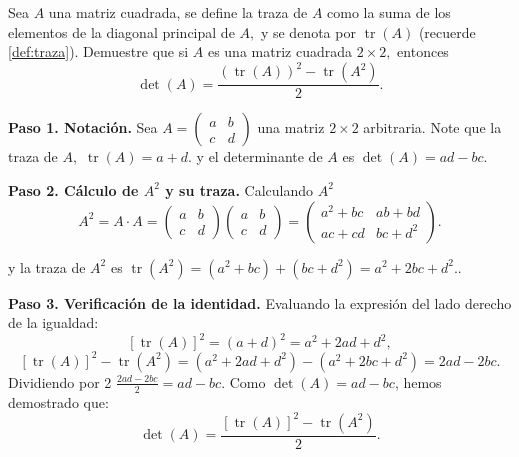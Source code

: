 \begin{prob} 
Sea $A$ una matriz cuadrada, se define la traza de $A$ como la suma de los elementos de la diagonal principal de $A,$ y se denota por $\operatorname{tr}(A)$ (recuerde \ref{def:traza}). Demuestre que si $A$ es una matriz cuadrada $2\times 2,$ entonces 
$$\det(A)=\dfrac{\left( \operatorname{tr}(A) \right)^{2}-\operatorname{tr}\left( A^{2} \right)}{2}.$$ 

\begin{myproof}
\textbf{Paso 1. Notación.} Sea \(A = \begin{pmatrix} a & b \\ c & d \end{pmatrix}\) una matriz \(2 \times 2\) arbitraria. Note que la traza de $A,$ \(
\operatorname{tr}(A) = a + d.
\) y el determinante de $A$ es \(
\det(A) = ad - bc.\)

\textbf{Paso 2. Cálculo de $A^2$ y su traza.} Calculando $A^2$
\[
A^2 = A \cdot A = \begin{pmatrix} a & b \\ c & d \end{pmatrix} \begin{pmatrix} a & b \\ c & d \end{pmatrix} = \begin{pmatrix} a^2 + bc & ab + bd \\ ac + cd & bc + d^2 \end{pmatrix}.
\]

 y la traza de $A^2$ es \(
\operatorname{tr}(A^2) = (a^2 + bc) + (bc + d^2) = a^2 + 2bc + d^2.
.\)

\textbf{Paso 3. Verificación de la identidad.} Evaluando la expresión del lado derecho de la igualdad:
\[
[\operatorname{tr}(A)]^2 = (a + d)^2 = a^2 + 2ad + d^2,
\]
\[
[\operatorname{tr}(A)]^2 - \operatorname{tr}(A^2) = (a^2 + 2ad + d^2) - (a^2 + 2bc + d^2) = 2ad - 2bc.
\]
Dividiendo por 2 \(
\frac{2ad - 2bc}{2} = ad - bc.
\) Como $\det(A) = ad - bc$, hemos demostrado que:
\[
\det(A) = \frac{[\operatorname{tr}(A)]^2 - \operatorname{tr}(A^2)}{2}.
\]
\end{myproof}
\end{prob}


